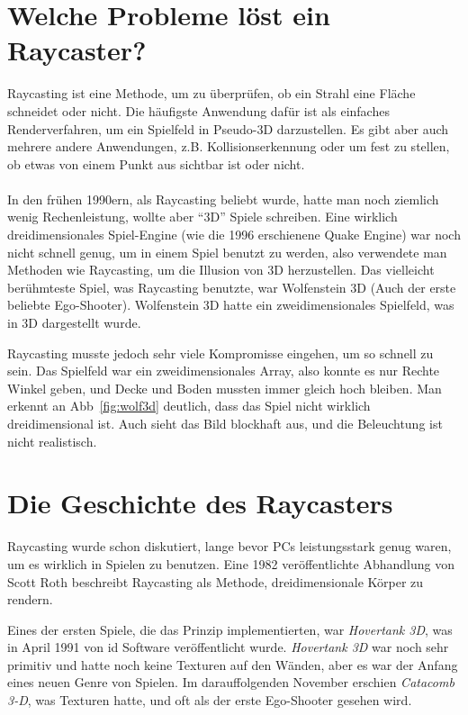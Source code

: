 \documentclass[a4paper,12pt]{report}
\begin{document}
\section{Welche Probleme l\"ost ein Raycaster?}
Raycasting ist eine Methode, um zu \"uberpr\"ufen, ob ein Strahl eine Fl\"ache schneidet oder nicht. Die h\"aufigste Anwendung daf\"ur ist als einfaches Renderverfahren, um ein Spielfeld in Pseudo-3D darzustellen. Es gibt aber auch mehrere andere Anwendungen, z.B. Kollisionserkennung oder um fest zu stellen, ob etwas von einem Punkt aus sichtbar ist oder nicht.

\paragraph*{}
In den fr\"uhen 1990ern, als Raycasting beliebt wurde, hatte man noch ziemlich wenig Rechenleistung, wollte aber ``3D'' Spiele schreiben. Eine wirklich dreidimensionales Spiel-Engine (wie die 1996 erschienene Quake Engine) war noch nicht schnell genug, um in einem Spiel benutzt zu werden, also verwendete man Methoden wie Raycasting, um die Illusion von 3D herzustellen. Das vielleicht ber\"uhmteste Spiel, was Raycasting benutzte, war Wolfenstein 3D (Auch der erste beliebte Ego-Shooter). Wolfenstein 3D hatte ein zweidimensionales Spielfeld, was in 3D dargestellt wurde.

Raycasting musste jedoch sehr viele Kompromisse eingehen, um so schnell zu sein. Das Spielfeld war ein zweidimensionales Array, also konnte es nur Rechte Winkel geben, und Decke und Boden mussten immer gleich hoch bleiben. Man erkennt an Abb~\ref{fig:wolf3d} deutlich, dass das Spiel nicht wirklich dreidimensional ist. Auch sieht das Bild blockhaft aus, und die Beleuchtung ist nicht realistisch.

\section{Die Geschichte des Raycasters}
Raycasting wurde schon diskutiert, lange bevor PCs leistungsstark genug waren, um es wirklich in Spielen zu benutzen. Eine 1982 ver\"offentlichte Abhandlung von Scott Roth beschreibt Raycasting als Methode, dreidimensionale K\"orper zu rendern.

Eines der ersten Spiele, die das Prinzip implementierten, war \textit{Hovertank 3D}, was in April 1991 von id Software ver\"offentlicht wurde. \textit{Hovertank 3D} war noch sehr primitiv und hatte noch keine Texturen auf den W\"anden, aber es war der Anfang eines neuen Genre von Spielen. Im darauffolgenden November erschien \textit{Catacomb 3-D}, was Texturen hatte, und oft als der erste Ego-Shooter gesehen wird.
\end{document}
